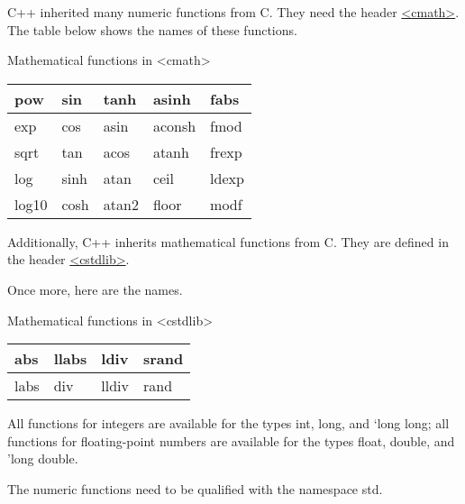 C++ inherited many numeric functions from C. They need the header \href{http://en.cppreference.com/w/cpp/numeric/math}{<cmath>}. The table below shows the names of these functions.

\begin{center}
Mathematical functions in <cmath>
\end{center}

\begin{longtable}[c]{lllll}
pow   & sin  & tanh  & asinh  & fabs  \\
\endfirsthead
%
\endhead
%
exp   & cos  & asin  & aconsh & fmod  \\
sqrt  & tan  & acos  & atanh  & frexp \\
log   & sinh & atan  & ceil   & ldexp \\
log10 & cosh & atan2 & floor  & modf 
\end{longtable}

Additionally, C++ inherits mathematical functions from C. They are defined in the header \href{http://en.cppreference.com/w/cpp/numeric/math}{<cstdlib>}.

Once more, here are the names.

\begin{center}
Mathematical functions in <cstdlib>
\end{center}

\begin{longtable}[c]{llll}
abs  & llabs & ldiv  & srand \\
\endfirsthead
%
\endhead
%
labs & div   & lldiv & rand 
\end{longtable}

All functions for integers are available for the types int, long, and ‘long long; all functions for floating-point numbers are available for the types float, double, and 'long double.

The numeric functions need to be qualified with the namespace std.


